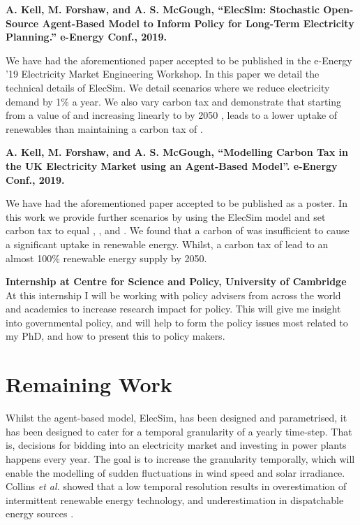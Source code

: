 \documentclass[12pt]{article}
\begin{document}
\vspace{5mm}
{\parindent0pt
\textbf{A. Kell, M. Forshaw, and A. S. McGough,  ``ElecSim: Stochastic Open-Source Agent-Based Model to Inform Policy for Long-Term Electricity Planning.''  e-Energy Conf., 2019.
}

We have had the aforementioned paper accepted to be published in the e-Energy '19 Electricity Market Engineering Workshop. In this paper we detail the technical details of ElecSim. We detail scenarios where we reduce electricity demand by 1\% a year. We also vary carbon tax and demonstrate that starting from a value of  and increasing linearly to  by 2050 \cite{Department2016}, leads to a lower uptake of renewables than maintaining a carbon tax of .

\vspace{5mm}
\textbf{A. Kell, M. Forshaw, and A. S. McGough, ``Modelling Carbon Tax in the UK Electricity Market using an Agent-Based Model''. e-Energy Conf., 2019.}

We have had the aforementioned paper accepted to be published as a poster. In this work we provide further scenarios by using the ElecSim model and set carbon tax to equal , , and . We found that a carbon of  was insufficient to cause a significant uptake in renewable energy. Whilst, a carbon tax of  lead to an almost 100\% renewable energy supply by 2050.

\vspace{5mm}
\textbf{Internship at Centre for Science and Policy, University of Cambridge} At this internship I will be working with policy advisers from across the world and academics to increase research impact for policy. This will give me insight into governmental policy, and will help to form the policy issues most related to my PhD, and how to present this to policy makers.
}
\clearpage

\section{Remaining Work}

Whilst the agent-based model, ElecSim, has been designed and parametrised, it has been designed to cater for a temporal granularity of a yearly time-step. That is, decisions for bidding into an electricity market and investing in power plants happens every year. The goal is to increase the granularity temporally, which will enable the modelling of sudden fluctuations in wind speed and solar irradiance. Collins \textit{et al.} showed that a low temporal resolution results in overestimation of intermittent renewable energy technology, and underestimation in dispatchable energy sources \cite{Collins2017}.
\end{document}
